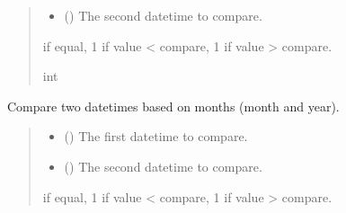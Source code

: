 \documentclass[letterpaper,10pt,english]{sphinxmanual}
\begin{document}
\begin{fulllineitems}
\begin{fulllineitems}
\begin{quote}
\begin{description}
\begin{itemize}
\item {} 
\sphinxAtStartPar
{} () \textendash{} The second datetime to compare.

\end{itemize}

 if equal, \sphinxhyphen{}1 if value \textless{} compare, 1 if value \textgreater{} compare.

\sphinxAtStartPar
int

\end{description}\end{quote}

\end{fulllineitems}


\begin{fulllineitems}
\label{\detokenize{apache_commons_validator_python.routines:apache_commons_validator_python.routines.calendar_validator.CalendarValidator.compare_months}}
\pysigstartsignatures
{}
\pysigstopsignatures
\sphinxAtStartPar
Compare two datetimes based on months (month and year).
\begin{quote}\begin{description}
\begin{itemize}
\item {} 
\sphinxAtStartPar
{} () \textendash{} The first datetime to compare.

\item {} 
\sphinxAtStartPar
{} () \textendash{} The second datetime to compare.

\end{itemize}

 if equal, \sphinxhyphen{}1 if value \textless{} compare, 1 if value \textgreater{} compare.


\end{description}
\end{quote}
\end{fulllineitems}
\end{fulllineitems}
\end{document}
